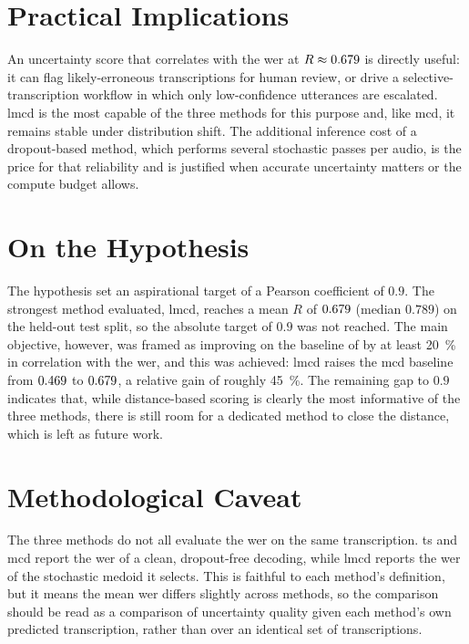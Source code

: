 \section{Practical Implications}

An uncertainty score that correlates with the \acrshort{wer} at $R \approx 0.679$ is directly useful: it can flag likely-erroneous transcriptions for human review, or drive a selective-transcription workflow in which only low-confidence utterances are escalated. \acrshort{lmcd} is the most capable of the three methods for this purpose and, like \acrshort{mcd}, it remains stable under distribution shift. The additional inference cost of a dropout-based method, which performs several stochastic passes per audio, is the price for that reliability and is justified when accurate uncertainty matters or the compute budget allows.

\section{On the Hypothesis}

The hypothesis set an aspirational target of a Pearson coefficient of $0.9$. The strongest method evaluated, \acrshort{lmcd}, reaches a mean $R$ of $0.679$ (median $0.789$) on the held-out test split, so the absolute target of $0.9$ was not reached. The main objective, however, was framed as improving on the baseline of \cite{rodriguez2024uncertainty} by at least \qty{20}{\percent} in correlation with the \acrshort{wer}, and this was achieved: \acrshort{lmcd} raises the \acrshort{mcd} baseline from $0.469$ to $0.679$, a relative gain of roughly \qty{45}{\percent}. The remaining gap to $0.9$ indicates that, while distance-based scoring is clearly the most informative of the three methods, there is still room for a dedicated method to close the distance, which is left as future work.

\section{Methodological Caveat}

The three methods do not all evaluate the \acrshort{wer} on the same transcription. \acrshort{ts} and \acrshort{mcd} report the \acrshort{wer} of a clean, dropout-free decoding, while \acrshort{lmcd} reports the \acrshort{wer} of the stochastic medoid it selects. This is faithful to each method's definition, but it means the mean \acrshort{wer} differs slightly across methods, so the comparison should be read as a comparison of uncertainty quality given each method's own predicted transcription, rather than over an identical set of transcriptions.

